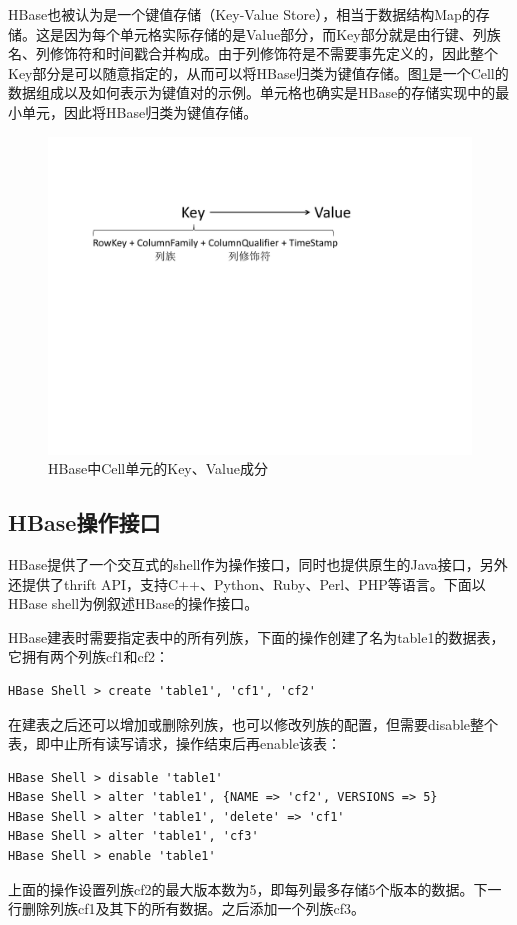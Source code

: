 HBase也被认为是一个键值存储（Key-Value Store），相当于数据结构Map的存储。这是因为每个单元格实际存储的是Value部分，而Key部分就是由行键、列族名、列修饰符和时间戳合并构成。由于列修饰符是不需要事先定义的，因此整个Key部分是可以随意指定的，从而可以将HBase归类为键值存储。图\ref{fig:hbase_cell}是一个Cell的数据组成以及如何表示为键值对的示例。单元格也确实是HBase的存储实现中的最小单元，因此将HBase归类为键值存储。

\begin{figure}[htbp]
\centering
\includegraphics[width=120mm]{fig/HBase_key_value.pdf}
\caption{HBase中Cell单元的Key、Value成分}
\label{fig:hbase_cell}
\end{figure}

\subsection{HBase操作接口}
HBase提供了一个交互式的shell作为操作接口，同时也提供原生的Java接口，另外还提供了thrift API，支持C++、Python、Ruby、Perl、PHP等语言。下面以HBase shell为例叙述HBase的操作接口。

HBase建表时需要指定表中的所有列族，下面的操作创建了名为table1的数据表，它拥有两个列族cf1和cf2：
\begin{verbatim}
HBase Shell > create 'table1', 'cf1', 'cf2'
\end{verbatim}

在建表之后还可以增加或删除列族，也可以修改列族的配置，但需要disable整个表，即中止所有读写请求，操作结束后再enable该表：
\begin{verbatim}
HBase Shell > disable 'table1'
HBase Shell > alter 'table1', {NAME => 'cf2', VERSIONS => 5}
HBase Shell > alter 'table1', 'delete' => 'cf1'
HBase Shell > alter 'table1', 'cf3'
HBase Shell > enable 'table1'
\end{verbatim}
上面的操作设置列族cf2的最大版本数为5，即每列最多存储5个版本的数据。下一行删除列族cf1及其下的所有数据。之后添加一个列族cf3。

